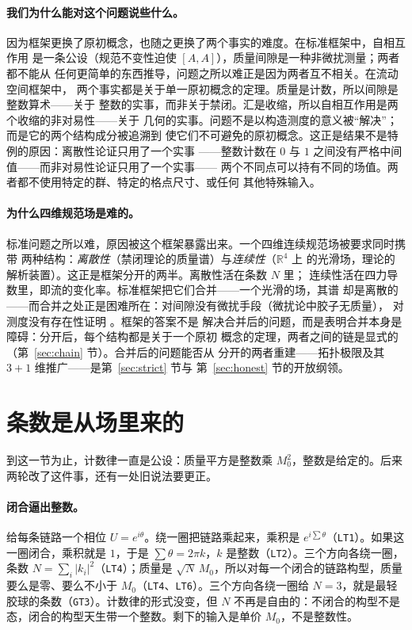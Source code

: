 \documentclass[aps,prd,preprint,superscriptaddress,amsmath,amssymb]{revtex4-2}
\begin{document}
\paragraph{我们为什么能对这个问题说些什么。}
因为框架更换了原初概念，也随之更换了两个事实的难度。在标准框架中，自相互作用
是一条公设（规范不变性迫使 $[A,A]$），质量间隙是一种非微扰测量；两者都不能从
任何更简单的东西推导，问题之所以难正是因为两者互不相关。在流动空间框架中，
两个事实都是关于单一原初概念的定理。质量是计数，所以间隙是整数算术——关于
整数的实事，而非关于禁闭。汇是收缩，所以自相互作用是两个收缩的非对易性——关于
几何的实事。问题不是以构造测度的意义被``解决''；而是它的两个结构成分被追溯到
使它们不可避免的原初概念。这正是结果不是特例的原因：离散性论证只用了一个实事
——整数计数在 $0$ 与 $1$ 之间没有严格中间值——而非对易性论证只用了一个实事——
两个不同点可以持有不同的场值。两者都不使用特定的群、特定的格点尺寸、或任何
其他特殊输入。

\paragraph{为什么四维规范场是难的。}
标准问题之所以难，原因被这个框架暴露出来。一个四维连续规范场被要求同时携带
两种结构：\emph{离散性}（禁闭理论的质量谱）与\emph{连续性}（$\mathbb{R}^4$ 上
的光滑场，理论的解析装置）。这正是框架分开的两半。离散性活在条数 $N$ 里；
连续性活在四力导数里，即流的变化率。标准框架把它们合并——一个光滑的场，其谱
却是离散的——而合并之处正是困难所在：对间隙没有微扰手段（微扰论中胶子无质量），
对测度没有存在性证明 \cite{jaffe2000yang,weinberg1995quantum}。框架的答案不是
解决合并后的问题，而是表明合并本身是障碍：分开后，每个结构都是关于一个原初
概念的定理，两者之间的链是显式的（第~\ref{sec:chain} 节）。合并后的问题能否从
分开的两者重建——拓扑极限及其 $3{+}1$ 维推广——是第~\ref{sec:strict} 节与
第~\ref{sec:honest} 节的开放纲领。

\section{条数是从场里来的}
\label{sec:closure}

到这一节为止，计数律一直是公设：质量平方是整数乘 $M_0^2$，整数是给定的。后来两轮改了这件事，还有一处旧说法要更正。

\paragraph{闭合逼出整数。}
给每条链路一个相位 $U=e^{i\theta}$。绕一圈把链路乘起来，乘积是 $e^{i\sum\theta}$（\texttt{LT1}）。如果这一圈闭合，乘积就是 $1$，于是 $\sum\theta=2\pi k$，$k$ 是整数（\texttt{LT2}）。三个方向各绕一圈，条数 $N=\sum_i|k_i|^2$（\texttt{LT4}）；质量是 $\sqrt N\,M_0$，所以对每一个闭合的链路构型，质量要么是零、要么不小于 $M_0$（\texttt{LT4}、\texttt{LT6}）。三个方向各绕一圈给 $N=3$，就是最轻胶球的条数（\texttt{GT3}）。计数律的形式没变，但 $N$ 不再是自由的：不闭合的构型不是态，闭合的构型天生带一个整数。剩下的输入是单价 $M_0$，不是整数性。
\end{document}
